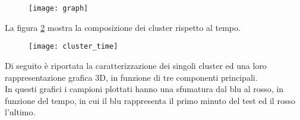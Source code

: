 \begin{figure}[!htbp]
  \centering
  \texttt{[image: graph]}
  \caption{}
  \label{graph}
\end{figure}
La figura \ref{cluster_time} mostra la composizione dei cluster rispetto al tempo.\\
\begin{figure}[!htbp]
  \centering
  \texttt{[image: cluster\_time]}
  \caption{}
  \label{cluster_time}
\end{figure}

\clearpage

Di seguito è riportata la caratterizzazione dei singoli cluster ed una loro
rappresentazione grafica 3D, in funzione di tre componenti principali.\\
In questi grafici i campioni plottati hanno una sfumatura dal blu al rosso, in
funzione del tempo, in cui il blu rappresenta il primo minuto del test ed il
rosso l'ultimo.\\

